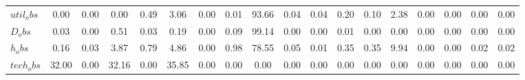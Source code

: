 \begin{center}
\begin{longtable}{lccccccccccccccccc}
$util_obs     $	 & 	            0.00	 & 	            0.00	 & 	            0.00	 & 	            0.49	 & 	            3.06	 & 	            0.00	 & 	            0.01	 & 	           93.66	 & 	            0.04	 & 	            0.04	 & 	            0.20	 & 	            0.10	 & 	            2.38	 & 	            0.00	 & 	            0.00	 & 	            0.00	 & 	            0.00 \\ 
$D_obs        $	 & 	            0.03	 & 	            0.00	 & 	            0.51	 & 	            0.03	 & 	            0.19	 & 	            0.00	 & 	            0.09	 & 	           99.14	 & 	            0.00	 & 	            0.00	 & 	            0.01	 & 	            0.00	 & 	            0.00	 & 	            0.00	 & 	            0.00	 & 	            0.00	 & 	            0.00 \\ 
$h_obs        $	 & 	            0.16	 & 	            0.03	 & 	            3.87	 & 	            0.79	 & 	            4.86	 & 	            0.00	 & 	            0.98	 & 	           78.55	 & 	            0.05	 & 	            0.01	 & 	            0.35	 & 	            0.35	 & 	            9.94	 & 	            0.00	 & 	            0.00	 & 	            0.02	 & 	            0.02 \\ 
$tech_obs     $	 & 	           32.00	 & 	            0.00	 & 	           32.16	 & 	            0.00	 & 	           35.85	 & 	            0.00	 & 	            0.00	 & 	            0.00	 & 	            0.00	 & 	            0.00	 & 	            0.00	 & 	            0.00	 & 	            0.00	 & 	            0.00	 & 	            0.00	 & 	            0.00	 & 	            0.00 \\ 
\end{longtable}
 \end{center}
